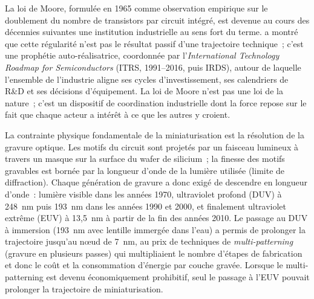 La loi de Moore, formulée en 1965 comme observation empirique sur le doublement du nombre de transistors par circuit intégré, est devenue au cours des décennies suivantes une institution industrielle au sens fort du terme. \textcite{mody_long_2017} a montré que cette régularité n'est pas le résultat passif d'une trajectoire technique~; c'est une prophétie auto-réalisatrice, coordonnée par l'\emph{International Technology Roadmap for Semiconductors} (ITRS, 1991--2016, puis IRDS), autour de laquelle l'ensemble de l'industrie aligne ses cycles d'investissement, ses calendriers de R\&D et ses décisions d'équipement. La loi de Moore n'est pas une loi de la nature~; c'est un dispositif de coordination industrielle dont la force repose sur le fait que chaque acteur a intérêt à ce que les autres y croient.

%
La contrainte physique fondamentale de la miniaturisation est la résolution de la gravure optique. Les motifs du circuit sont projetés par un faisceau lumineux à travers un masque sur la surface du wafer de silicium~; la finesse des motifs gravables est bornée par la longueur d'onde de la lumière utilisée (limite de diffraction). Chaque génération de gravure a donc exigé de descendre en longueur d'onde~: lumière visible dans les années 1970, ultraviolet profond (DUV) à 248~nm puis 193~nm dans les années 1990 et 2000, et finalement ultraviolet extrême (EUV) à 13,5~nm à partir de la fin des années 2010. Le passage au DUV à immersion (193~nm avec lentille immergée dans l'eau) a permis de prolonger la trajectoire jusqu'au n{\oe}ud de 7~nm, au prix de techniques de \emph{multi-patterning} (gravure en plusieurs passes) qui multipliaient le nombre d'étapes de fabrication et donc le coût et la consommation d'énergie par couche gravée. Lorsque le multi-patterning est devenu économiquement prohibitif, seul le passage à l'EUV pouvait prolonger la trajectoire de miniaturisation.

